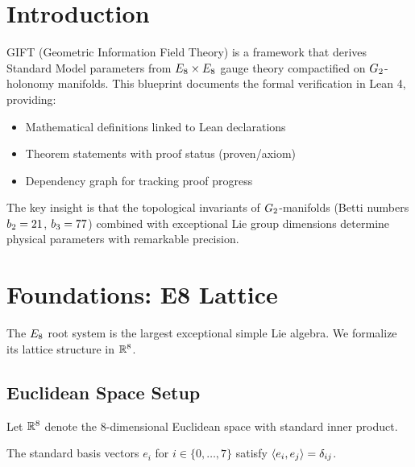
\chapter{Introduction}

GIFT (Geometric Information Field Theory) is a framework that derives Standard Model
parameters from $E_8 \times E_8$ gauge theory compactified on $G_2$-holonomy
manifolds. This blueprint documents the formal verification in Lean 4, providing:

\begin{itemize}
    \item Mathematical definitions linked to Lean declarations
    \item Theorem statements with proof status (proven/axiom)
    \item Dependency graph for tracking proof progress
\end{itemize}

The key insight is that the topological invariants of $G_2$-manifolds (Betti numbers
$b_2 = 21$, $b_3 = 77$) combined with exceptional Lie group dimensions determine
physical parameters with remarkable precision.

\chapter{Foundations: E8 Lattice}\label{chap:e8}

The $E_8$ root system is the largest exceptional simple Lie algebra.
We formalize its lattice structure in $\mathbb{R}^8$.

\section{Euclidean Space Setup}

\begin{definition}\label{def:R8}
    \leanok
    Let $\mathbb{R}^8$ denote the 8-dimensional Euclidean space with standard inner product.
\end{definition}

\begin{definition}\label{def:stdBasis}
    \leanok
    The standard basis vectors $e_i$ for $i \in \{0, \ldots, 7\}$ satisfy
    $\langle e_i, e_j \rangle = \delta_{ij}$.
\end{definition}

